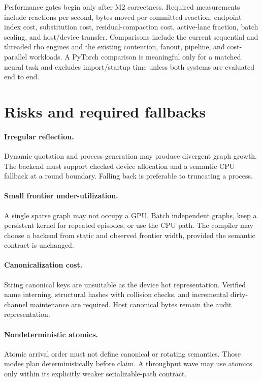 \documentclass[11pt]{article}
\begin{document}
Performance gates begin only after M2 correctness.  Required measurements
include reactions per second, bytes moved per committed reaction, endpoint
index cost, substitution cost, residual-compaction cost, active-lane fraction,
batch scaling, and host/device transfer.  Comparisons include the current
sequential and threaded rho engines and the existing contention, fanout,
pipeline, and cost-parallel workloads.  A PyTorch comparison is meaningful
only for a matched neural task and excludes import/startup time unless both
systems are evaluated end to end.

\section{Risks and required fallbacks}

\paragraph{Irregular reflection.}
Dynamic quotation and process generation may produce divergent graph growth.
The backend must support checked device allocation and a semantic CPU fallback
at a round boundary.  Falling back is preferable to truncating a process.

\paragraph{Small frontier under-utilization.}
A single sparse graph may not occupy a GPU.  Batch independent graphs, keep a
persistent kernel for repeated episodes, or use the CPU path.  The compiler
may choose a backend from static and observed frontier width, provided the
semantic contract is unchanged.

\paragraph{Canonicalization cost.}
String canonical keys are unsuitable as the device hot representation.
Verified name interning, structural hashes with collision checks, and
incremental dirty-channel maintenance are required.  Host canonical bytes
remain the audit representation.

\paragraph{Nondeterministic atomics.}
Atomic arrival order must not define canonical or rotating semantics.  Those
modes plan deterministically before claim.  A throughput wave may use atomics
only within its explicitly weaker serializable-path contract.
\end{document}
